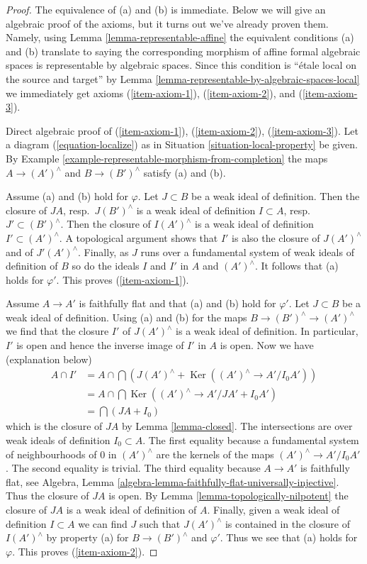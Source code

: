 \documentclass{stacks-project}
\theoremstyle{plain}
\theoremstyle{definition}
\theoremstyle{remark}
\numberwithin{equation}{subsection}
\def\Ker{\mathop{\mathrm{Ker}}}
\begin{document}
\begin{proof}
The equivalence of (a) and (b) is immediate. Below we will give an
algebraic proof of the axioms, but it turns out we've already proven
them. Namely, using Lemma \ref{lemma-representable-affine}
the equivalent conditions (a) and (b) translate to saying the
corresponding morphism of affine formal algebraic spaces is representable
by algebraic spaces.
Since this condition is ``\'etale local on the source and target'' by
Lemma \ref{lemma-representable-by-algebraic-spaces-local}
we immediately get axioms (\ref{item-axiom-1}), (\ref{item-axiom-2}), and
(\ref{item-axiom-3}).

\medskip\noindent
Direct algebraic proof of (\ref{item-axiom-1}), (\ref{item-axiom-2}),
(\ref{item-axiom-3}). Let a diagram (\ref{equation-localize}) as in
Situation \ref{situation-local-property} be given.
By Example \ref{example-representable-morphism-from-completion}
the maps $A \to (A')^\wedge$ and $B \to (B')^\wedge$
satisfy (a) and (b).

\medskip\noindent
Assume (a) and (b) hold for $\varphi$. Let $J \subset B$ be a weak ideal
of definition. Then the closure of $JA$, resp.\ $J(B')^\wedge$
is a weak ideal of definition $I \subset A$, resp.\ $J' \subset (B')^\wedge$.
Then the closure of $I(A')^\wedge$ is a weak ideal of definition
$I' \subset (A')^\wedge$. A topological argument shows that $I'$ is also
the closure of $J(A')^\wedge$ and of $J'(A')^\wedge$.
Finally, as $J$ runs over a fundamental system of weak ideals of definition
of $B$ so do the ideals $I$ and $I'$ in $A$ and $(A')^\wedge$.
It follows that (a) holds for $\varphi'$. This proves (\ref{item-axiom-1}).

\medskip\noindent
Assume $A \to A'$ is faithfully flat and that (a) and (b) hold for $\varphi'$.
Let $J \subset B$ be a weak ideal of definition. Using (a) and (b)
for the maps $B \to (B')^\wedge \to (A')^\wedge$ we find that the
closure $I'$ of $J(A')^\wedge$ is a weak ideal of definition.
In particular, $I'$ is open and hence the inverse image of $I'$
in $A$ is open. Now we have (explanation below)
\begin{align*}
A \cap I'
& =
A \cap \bigcap (J(A')^\wedge + \Ker((A')^\wedge \to A'/I_0A')) \\
& =
A \cap \bigcap \Ker((A')^\wedge \to A'/JA' + I_0 A') \\
& = \bigcap (JA + I_0)
\end{align*}
which is the closure of $JA$ by Lemma \ref{lemma-closed}.
The intersections are over weak ideals of definition $I_0 \subset A$.
The first equality because a fundamental system of neighbourhoods of
$0$ in $(A')^\wedge$ are the kernels of the maps $(A')^\wedge \to A'/I_0A'$.
The second equality is trivial. The third equality because $A \to A'$
is faithfully flat, see
Algebra, Lemma \ref{algebra-lemma-faithfully-flat-universally-injective}.
Thus the closure of $JA$ is open. By Lemma \ref{lemma-topologically-nilpotent}
the closure of $JA$
is a weak ideal of definition of $A$. Finally, given a weak
ideal of definition $I \subset A$ we can find $J$ such that
$J(A')^\wedge$ is contained in the closure of $I(A')^\wedge$
by property (a) for $B \to (B')^\wedge$ and $\varphi'$.
Thus we see that (a) holds for $\varphi$. This proves (\ref{item-axiom-2}).


\end{proof}
\end{document}
